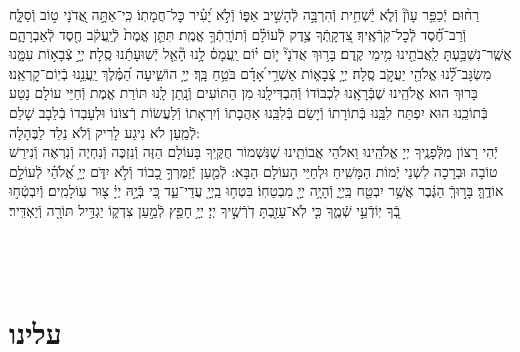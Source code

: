 \documentclass[twoside, openany, parskip=half, 11pt]{book}
\begin{document}
%
רַח֨וּם יְֿכַפֵּ֥ר עָוֹן֘ וְֿלֹ֢א יַ֫שְׁחִ֥ית וְֿהִרְבָּ֣ה לְֿהָשִׁ֣יב אַפּ֑וֹ וְֿלֹ֣א יָ֝עִ֗יר כׇּל־חֲמָתֽוֹ׃ כִּֽי־אַתָּ֣ה
%
אֲ֭דֹנָי ט֣וֹב וְֿסַלָּ֑ח וְֿרַב־חֶ֝֗סֶד לְֿכׇל־קֹֽרְֿאֶֽיךָ׃ צִ֭דְקָֽתְֿךָ
%
צֶ֥דֶק לְֿעוֹלָ֗ם וְֿתוֹרָֽתְֿךָ֥ אֱמֶֽת׃ תִּתֵּ֤ן
%
אֱמֶת֙ לְֿיַֽעֲקֹ֔ב חֶ֖סֶד לְֿאַבְרָהָ֑ם אֲשֶֽׁר־נִשְׁבַּ֥עְתָּ לַֽאֲבֹתֵ֖ינוּ מִ֥ימֵי קֶֽדֶם׃ בָּר֥וּךְ
%
אֲדֹנָי֘ י֤וֹם י֗וֹם יַֽעֲמָס֫ לָ֥נוּ הָ֘אֵ֤ל יְֿשֽׁוּעָתֵ֬נוּ סֶֽלָה׃ יְיָ֣
%
צְֿבָא֣וֹת עִמָּ֑נוּ מִשְׂגָּב־לָ֝֗נוּ אֱלֹהֵ֖י יַעֲקֹ֣ב סֶֽלָה׃ יְיָ֥
%
צְֿבָא֑וֹת אַשְׁרֵ֥י ֝אָדָ֗ם בֹּטֵ֥חַ בָּֽךְ׃ יְיָ֥
%
הוֹשִׁ֑יעָה הַ֝מֶּ֗לֶךְ יַֽעֲנֵ֥נוּ בְֿיֽוֹם־קׇרְאֵֽנוּ׃ \\
בָּרוּךְ הוּא אֱלֹהֵֽינוּ שֶׁבְּֿרָאָֽנוּ לִכְבוֹדוֹ וְֿהִבְדִּילָֽנוּ מִן הַתּוֹעִים וְֿנָֽתַן לָֽנוּ תּוֹרַת אֱמֶת וְֿחַיֵּי עוֹלָם נָטַע בְּֿתוֹכֵֽנוּ הוּא יִפְתַּח לִבֵּֽנוּ בְּֿתוֹרָתוֹ וְֿיָשֵׂם בְּֿלִבֵּֽנוּ אַהֲבָתוֹ וְֿיִרְאָתוֹ וְֿלַעֲשׂוֹת רְֿצוֹנוֹ וּלְעָבְדוֹ בְֿלֵבָב שָׁלֵם לְֿמַֽעַן לֹא נִיגַע לָרִיק וְֿלֹא נֵלֵד לַבֶּהָלָה:\\
יְֿהִי רָצוֹן מִלְּֿפָנֶֽיךָ יְיָ אֱלֹהֵֽינוּ וֵאלֹהֵי אֲבוֹתֵֽינוּ שֶׁנִּשְׁמוֹר חֻקֶּֽיךָ בָּעוֹלָם הַזֶּה וְֿנִזְכֶּה וְֿנִחְיֶה וְֿנִרְאֶה וְֿנִירַשׁ טוֹבָה וּבְרָכָה לִשְׁנֵי יְֿמוֹת הַמָּשִֽׁיחַ וּלְחַיֵּי הָעוֹלָם הַבָּא: לְֿמַ֤עַן יְֿזַמֶּרְךָ֣ כָ֭בוֹד וְֿלֹ֣א יִדֹּ֑ם יְיָ֥ אֱ֝לֹהַ֗י לְֿעוֹלָ֣ם אוֹדֶֽךָּ׃ בָּר֣וּךְֿ הַגֶּ֔בֶר אֲשֶׁ֥ר יִבְטַ֖ח בַּֽיְיָ֑ וְֿהָיָ֥ה יְיָ֖ מִבְטַחֽוֹ׃ בִּטְח֥וּ
%
בַֽיְיָ֖ עֲדֵי־עַ֑ד כִּ֚י בְּֿיָ֣הּ יְיָ֔ צ֖וּר עֽוֹלָמִֽים׃  וְֿיִבְטְֿח֣וּ
%
בְֿ֭ךָ יֽוֹדְֿעֵ֣י שְֿׁמֶ֑ךָ כִּ֤י לֹֽא־עָזַ֖בְתָּ דֹֽרְֿשֶׁ֣יךָ יְיָ׃ יְיָ֥
%
חָפֵ֖ץ לְֿמַ֣עַן צִדְק֑וֹ יַגְדִּ֥יל תּוֹרָ֖ה וְֿיַאְדִּֽיר׃

\fullkaddish

\vfill

\\
\\

\clearpage
\section*{ עלינו }

\aleinu

\end{document}
